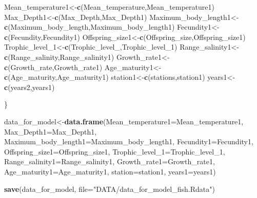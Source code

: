 \documentclass[
]{article}
\newenvironment{Shaded}{\begin{snugshade}}{\end{snugshade}}
\newcommand{\AttributeTok}[1]{\textcolor[rgb]{0.13,0.29,0.53}{#1}}
\newcommand{\FunctionTok}[1]{\textcolor[rgb]{0.13,0.29,0.53}{\textbf{#1}}}
\newcommand{\NormalTok}[1]{#1}
\newcommand{\OtherTok}[1]{\textcolor[rgb]{0.56,0.35,0.01}{#1}}
\newcommand{\StringTok}[1]{\textcolor[rgb]{0.31,0.60,0.02}{#1}}
\begin{document}
\begin{Shaded}
\begin{Highlighting}[]
\NormalTok{  Mean\_temperature1}\OtherTok{\textless{}{-}}\FunctionTok{c}\NormalTok{(Mean\_temperature,Mean\_temperature1)}
\NormalTok{  Max\_Depth1}\OtherTok{\textless{}{-}}\FunctionTok{c}\NormalTok{(Max\_Depth,Max\_Depth1)}
\NormalTok{  Maximum\_body\_length1}\OtherTok{\textless{}{-}}\FunctionTok{c}\NormalTok{(Maximum\_body\_length,Maximum\_body\_length1)}
\NormalTok{  Fecundity1}\OtherTok{\textless{}{-}}\FunctionTok{c}\NormalTok{(Fecundity,Fecundity1)}
\NormalTok{  Offspring\_size1}\OtherTok{\textless{}{-}}\FunctionTok{c}\NormalTok{(Offspring\_size,Offspring\_size1)}
\NormalTok{  Trophic\_level\_1}\OtherTok{\textless{}{-}}\FunctionTok{c}\NormalTok{(Trophic\_level\_,Trophic\_level\_1)}
\NormalTok{  Range\_salinity1}\OtherTok{\textless{}{-}}\FunctionTok{c}\NormalTok{(Range\_salinity,Range\_salinity1)}
\NormalTok{  Growth\_rate1}\OtherTok{\textless{}{-}}\FunctionTok{c}\NormalTok{(Growth\_rate,Growth\_rate1)}
\NormalTok{  Age\_maturity1}\OtherTok{\textless{}{-}}\FunctionTok{c}\NormalTok{(Age\_maturity,Age\_maturity1)}
\NormalTok{  station1}\OtherTok{\textless{}{-}}\FunctionTok{c}\NormalTok{(stations,station1)}
\NormalTok{  years1}\OtherTok{\textless{}{-}}\FunctionTok{c}\NormalTok{(years2,years1)}
  
\NormalTok{\}}


\NormalTok{data\_for\_model}\OtherTok{\textless{}{-}}\FunctionTok{data.frame}\NormalTok{(}\AttributeTok{Mean\_temperature1=}\NormalTok{Mean\_temperature1,}
                           \AttributeTok{Max\_Depth1=}\NormalTok{Max\_Depth1,}
                           \AttributeTok{Maximum\_body\_length1=}\NormalTok{Maximum\_body\_length1,}
                           \AttributeTok{Fecundity1=}\NormalTok{Fecundity1,}
                           \AttributeTok{Offspring\_size1=}\NormalTok{Offspring\_size1,}
                           \AttributeTok{Trophic\_level\_1=}\NormalTok{Trophic\_level\_1,}
                           \AttributeTok{Range\_salinity1=}\NormalTok{Range\_salinity1,}
                           \AttributeTok{Growth\_rate1=}\NormalTok{Growth\_rate1,}
                           \AttributeTok{Age\_maturity1=}\NormalTok{Age\_maturity1,}
                           \AttributeTok{station=}\NormalTok{station1, }
                           \AttributeTok{years1=}\NormalTok{years1)}


\FunctionTok{save}\NormalTok{(data\_for\_model, }\AttributeTok{file=}\StringTok{"DATA/data\_for\_model\_fish.Rdata"}\NormalTok{)}
\end{Highlighting}
\end{Shaded}
\end{document}
